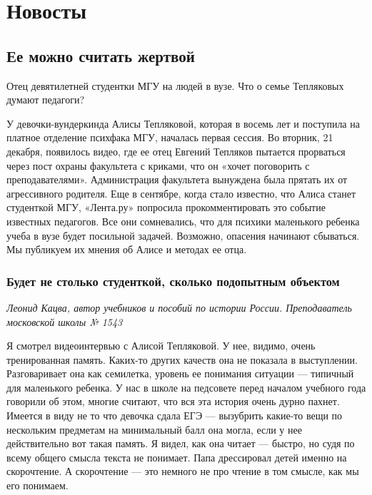
\chapter{Новосты}

\section{Ее можно считать жертвой}
Отец девятилетней студентки МГУ  на людей в вузе. Что о семье Тепляковых думают педагоги?

У девочки-вундеркинда Алисы Тепляковой, которая в восемь лет  и поступила на платное отделение психфака МГУ, началась первая сессия. Во вторник, 21 декабря, появилось видео, где ее отец Евгений Тепляков пытается прорваться через пост охраны факультета с криками, что он «хочет поговорить с преподавателями». Администрация факультета вынуждена была прятать их от агрессивного родителя. Еще в сентябре, когда стало известно, что Алиса станет студенткой МГУ, «Лента.ру» попросила прокомментировать это событие известных педагогов. Все они сомневались, что для психики маленького ребенка учеба в вузе будет посильной задачей. Возможно, опасения начинают сбываться. Мы публикуем их мнения об Алисе и методах ее отца.

\subsection{Будет не столько студенткой, сколько подопытным объектом}
\textit{Леонид Кацва, автор учебников и пособий по истории России. Преподаватель московской школы № 1543}

Я смотрел видеоинтервью с Алисой Тепляковой. У нее, видимо, очень тренированная память. Каких-то других качеств она не показала в выступлении. Разговаривает она как семилетка, уровень ее понимания ситуации --- типичный для маленького ребенка. У нас в школе на педсовете перед началом учебного года говорили об этом, многие считают, что вся эта история очень дурно пахнет. Имеется в виду не то что девочка сдала ЕГЭ --- вызубрить какие-то вещи по нескольким предметам на минимальный балл она могла, если у нее действительно вот такая память. Я видел, как она читает --- быстро, но судя по всему общего смысла текста не понимает. Папа дрессировал детей именно на скорочтение. А скорочтение --- это немного не про чтение в том смысле, как мы его понимаем.

